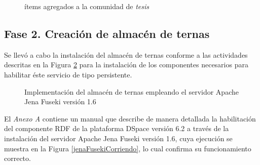 \begin{figure}[!ht]
	\centering
    \caption{\'items agregados a la comunidad de \textit{tesis}}
    \label{itemsAgregados}
\end{figure}

\subsection{Fase 2. Creaci\'on de almac\'en de ternas}

Se llev\'o a cabo la instalaci\'on del almac\'en de ternas conforme a las actividades descritas en la Figura \ref{instalacionTriplestore} para la instalaci\'on de los componentes necesarios para habilitar \'este servicio de tipo persistente.

\begin{figure}[!ht]
	\centering
    \caption{Implementaci\'on del almac\'en de ternas empleando el servidor Apache Jena Fuseki versi\'on 1.6}
    \label{instalacionTriplestore}
\end{figure}

El \textit{Anexo A} contiene un manual que describe de manera detallada la habilitaci\'on del componente RDF de la plataforma DSpace versi\'on 6.2 a trav\'es de la instalaci\'on del servidor Apache Jena Fuseki versi\'on 1.6, cuya ejecuci\'on se muestra en la Figura \ref{jenaFusekiCorriendo}, lo cual confirma su funcionamiento correcto.

